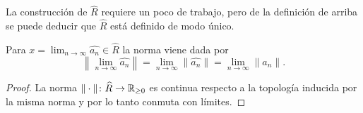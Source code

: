 \documentclass{article}
\numberwithin{equation}{section}
\theoremstyle{definition}
\begin{document}
La construcción de $\widehat{R}$ requiere un poco de trabajo, pero de
la definición de arriba se puede deducir que $\widehat{R}$ está definido
de modo único.

\begin{lema}
  \label{lema:norma-sobre-la-completacion}
  Para $x = \lim_{n\to\infty} \widehat{a_n} \in \widehat{R}$ la norma viene dada
  por
  \[ \left\|\lim_{n\to\infty} \widehat{a_n}\right\| =
     \lim_{n\to\infty} \|\widehat{a_n}\| =
     \lim_{n\to\infty} \|a_n\|. \]

  \begin{proof}
    La norma $\|\cdot\|\colon \widehat{R}\to \mathbb{R}_{\ge 0}$ es continua respecto
    a la topología inducida por la misma norma y por lo tanto conmuta con
    límites.
  \end{proof}
\end{lema}
\end{document}
